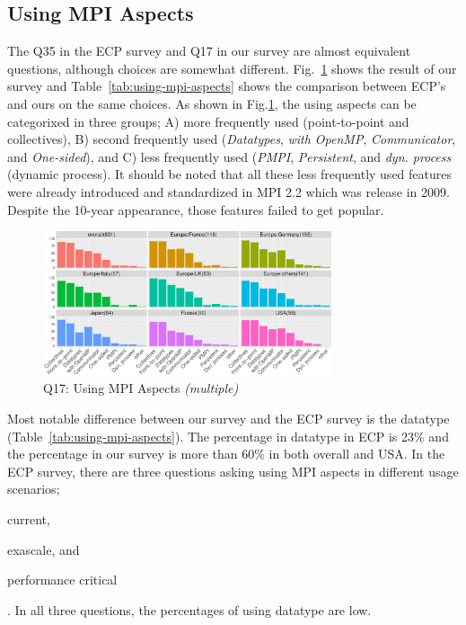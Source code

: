 \documentclass[preprint,5p,times]{elsarticle}
\def\myquote#1{{\it #1}}
\begin{document}
\subsection{Using MPI Aspects}\label{sec:mpi-aspects}

The Q35 in the ECP survey and Q17 in our survey are almost equivalent
questions, although choices are somewhat
different. Fig.~\ref{fig:using-mpi-aspects} shows the result of our
survey and Table~\ref{tab:using-mpi-aspects} shows the comparison
between ECP's and ours on the same choices. As shown in
Fig.\ref{fig:using-mpi-aspects}, the
using aspects can be categorixed in three groups; A) more frequently
used (point-to-point and collectives), B) second frequently used
(\myquote{Datatypes}, \myquote{with OpenMP}, \myquote{Communicator}, and \myquote{One-sided}), and C) less
frequently used (\myquote{PMPI}, \myquote{Persistent}, and
\myquote{dyn. process} (dynamic process).
It should be noted that all these less frequently used features were
already introduced and standardized in MPI 2.2 which was release in
2009. Despite the 10-year appearance, those features failed to get
popular.

\begin{figure}[htb]
  \begin{center}
    \includegraphics[width=8.5cm]{R-scripts/Q17.pdf}
    \caption{Q17: Using MPI Aspects {\it(multiple)}}
    \label{fig:using-mpi-aspects}
  \end{center}
\end{figure}

Most notable difference between our survey and the ECP survey is the
datatype (Table~\ref{tab:using-mpi-aspects}). The percentage in
datatype in ECP is 23\% and the percentage in our survey is more
than 60\% in both overall and USA. In the ECP survey, there are three
questions asking using MPI aspects in different usage scenarios;
\begin{enumerate*}
\item current,
\item exascale, and
\item performance critical
\end{enumerate*}. %
In all three questions, the percentages of using datatype are low.
\end{document}
